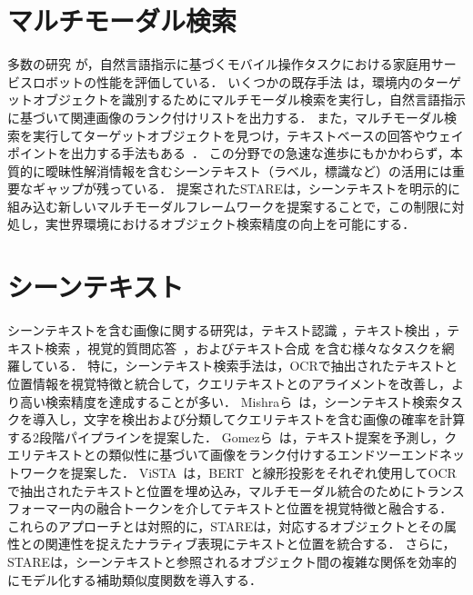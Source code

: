 \section{マルチモーダル検索}
多数の研究 \cite{Yenamandra2023HomeRobotOM, robocup}が，自然言語指示に基づくモバイル操作タスクにおける家庭用サービスロボットの性能を評価している．
いくつかの既存手法 \cite{nlmap, Sigurdsson2023RRExBoTRR, dm2rm, relaxformer}は，環境内のターゲットオブジェクトを識別するためにマルチモーダル検索を実行し，自然言語指示に基づいて関連画像のランク付けリストを出力する．
また，マルチモーダル検索を実行してターゲットオブジェクトを見つけ，テキストベースの回答やウェイポイントを出力する手法もある~\cite{xie2025embodiedrag}．
この分野での急速な進歩にもかかわらず，本質的に曖昧性解消情報を含むシーンテキスト（ラベル，標識など）の活用には重要なギャップが残っている．
提案されたSTAREは，シーンテキストを明示的に組み込む新しいマルチモーダルフレームワークを提案することで，この制限に対処し，実世界環境におけるオブジェクト検索精度の向上を可能にする．

\section{シーンテキスト}
シーンテキストを含む画像に関する研究は，テキスト認識 \cite{Zhao2023MultimodalIL, OTE}，テキスト検出 \cite{Liang_2024_CVPR, STEP, Zheng_2024_CVPR}，テキスト検索 \cite{Zeng2024FocusDA, Zheng_2024_CVPR, vista}，視覚的質問応答~\cite{Biten2021LaTrLT, stvqa, Gao2020MultiModalGN}，およびテキスト合成 \cite{Cui_2024_CVPR, Duan2024ODMAT, Santoso2023OnMS}を含む様々なタスクを網羅している．
特に，シーンテキスト検索手法は，OCRで抽出されたテキストと位置情報を視覚特徴と統合して，クエリテキストとのアライメントを改善し，より高い検索精度を達成することが多い．
Mishraら~\cite{ocrvqa}は，シーンテキスト検索タスクを導入し，文字を検出および分類してクエリテキストを含む画像の確率を計算する2段階パイプラインを提案した．
Gomezら~\cite{GomezMaflaECCV2018single}は，テキスト提案を予測し，クエリテキストとの類似性に基づいて画像をランク付けするエンドツーエンドネットワークを提案した．
ViSTA~\cite{vista}は，BERT~\cite{Devlin2019BERTPO}と線形投影をそれぞれ使用してOCRで抽出されたテキストと位置を埋め込み，マルチモーダル統合のためにトランスフォーマー内の融合トークンを介してテキストと位置を視覚特徴と融合する．
これらのアプローチとは対照的に，STAREは，対応するオブジェクトとその属性との関連性を捉えたナラティブ表現にテキストと位置を統合する．
さらに，STAREは，シーンテキストと参照されるオブジェクト間の複雑な関係を効率的にモデル化する補助類似度関数を導入する．

